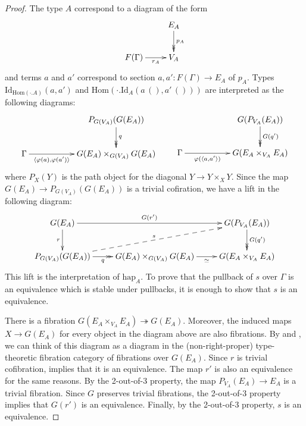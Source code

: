 \documentclass[reqno]{amsart}
\theoremstyle{definition}
\theoremstyle{remark}
\newcommand{\fs}[1]{\mathrm{#1}}
\newcommand{\Hom}{\fs{Hom}}
\newcommand{\Id}{\fs{Id}}
\numberwithin{figure}{section}
\begin{document}
\begin{proof}
The type $A$ correspond to a diagram of the form
\[ \xymatrix{                           & E_A \ar@{->>}[d]^{p_A} \\
              F(\Gamma) \ar[r]_-{r_A}   & V_A
            } \]
and terms $a$ and $a'$ correspond to section $a,a' : F(\Gamma) \to E_A$ of $p_A$.
Types $\Id_{\Hom(\cdot . A)}(a,a')$ and $\Hom(\cdot . \Id_A(a\,(),a'\,()))$ are interpreted as the following diagrams:
\[ \xymatrix{                                                           & & P_{G(V_A)}(G(E_A)) \ar@{->>}[d]^q \\
              \Gamma \ar[rr]_-{\langle \varphi(a), \varphi(a') \rangle} & & G(E_A) \times_{G(V_A)} G(E_A)
            } \qquad
   \xymatrix{                                                   & & G(P_{V_A}(E_A)) \ar@{->>}[d]^{G(q')} \\
              \Gamma \ar[rr]_-{\varphi(\langle a, a' \rangle)}  & & G(E_A \times_{V_A} E_A)
            } \]
where $P_{X}(Y)$ is the path object for the diagonal $Y \to Y \times_{X} Y$.
Since the map $G(E_A) \to P_{G(V_A)}(G(E_A))$ is a trivial cofiration, we have a lift in the following diagram:
\[ \xymatrix{ G(E_A) \ar[d]_r \ar[rr]^-{G(r')}                      &                                               & G(P_{V_A}(E_A)) \ar@{->>}[d]^{G(q')} \\
              P_{G(V_A)}(G(E_A)) \ar@{->>}[r]_-q \ar@{-->}[urr]^s   & G(E_A) \times_{G(V_A)} G(E_A) \ar[r]_-\simeq  & G(E_A \times_{V_A} E_A)
            } \]
This lift is the interpretation of $\fs{hap}_A$.
To prove that the pullback of $s$ over $\Gamma$ is an equivalence which is stable under pullbacks, it is enough to show that $s$ is an equivalence.

There is a fibration $G(E_A \times_{V_A} E_A) \twoheadrightarrow G(E_A)$.
Moreover, the induced maps $X \to G(E_A)$ for every object in the diagram above are also fibrations.
By  and , we can think of this diagram as a diagram in the (non-right-proper) type-theoretic fibration category of fibrations over $G(E_A)$.
Since $r$ is trivial cofibration, \cite[Lemma~3.6]{shul-inv} implies that it is an equivalence.
The map $r'$ is also an equivalence for the same reasons.
By the 2-out-of-3 property, the map $P_{V_A}(E_A) \to E_A$ is a trivial fibration.
Since $G$ preserves trivial fibrations, the 2-out-of-3 property implies that $G(r')$ is an equivalence.
Finally, by the 2-out-of-3 property, $s$ is an equivalence.
\end{proof}
\end{document}
